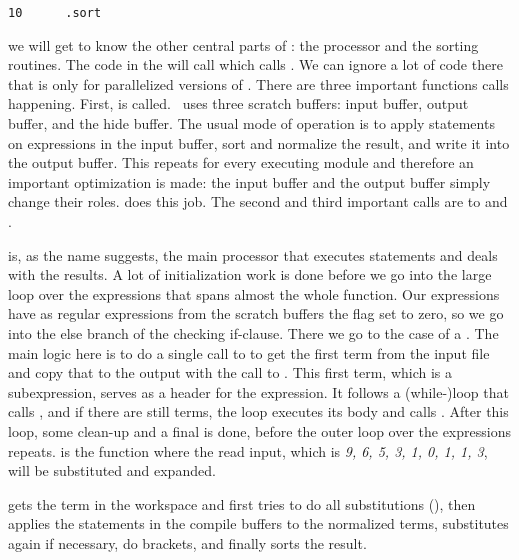 \begin{verbatim}
10      .sort
\end{verbatim}

we will get to know the other central parts of \FORM: the processor and the
sorting routines. The code in the  will call
which calls . We can ignore a lot of code there that is only for
parallelized versions of \FORM. There are three important functions calls
happening. First,  is called. \FORM\ uses three scratch
buffers: input buffer, output buffer, and the hide buffer. The usual mode of
operation is to apply statements on expressions in the input buffer, sort and
normalize the result, and write it into the output buffer. This repeats for
every executing module and therefore an important optimization is made: the
input buffer and the output buffer simply change their roles.
 does this job.  The second and third important calls are to
 and . 

 is, as the name suggests, the main processor that executes
statements and deals with the results. A lot of initialization work is done
before we go into the large loop over the expressions that spans almost the
whole function. Our expressions have as regular expressions from the scratch
buffers the  flag set to zero, so we go into the else branch of the
checking if-clause. There we go to the case of a . The main
logic here is to do a single call to  to get the first term from
the input file and copy that to the output with the call to . This
first term, which is a subexpression, serves as a header for the expression. It
follows a (while-)loop that calls , and if there are still terms,
the loop executes its body and calls . After this loop, some
clean-up and a final  is done, before the outer loop over the
expressions repeats.  is the function where the read input, which
is {\it 9, 6, 5, 3, 1, 0, 1, 1, 3}, will be substituted and expanded.

 gets the term in the workspace and first tries to do all
substitutions (), then applies the statements in the compile
buffers to the normalized terms, substitutes again if necessary, do brackets,
and finally sorts the result.

